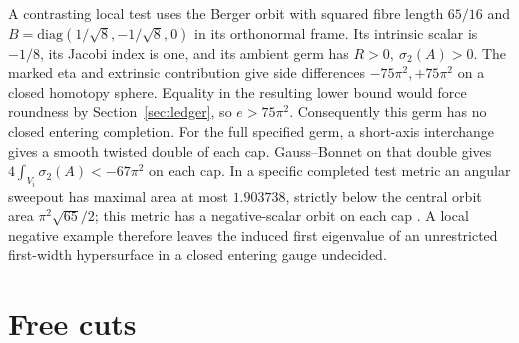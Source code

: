 \documentclass[11pt,letterpaper]{article}
\numberwithin{equation}{section}
\theoremstyle{definition}
\begin{document}
A contrasting local test uses the Berger orbit with squared fibre
length \(65/16\) and \(B=\mathrm{diag}(1/\sqrt8,-1/\sqrt8,0)\) in its
orthonormal frame. Its intrinsic scalar is \(-1/8\), its Jacobi index
is one, and its ambient germ has \(R>0,\ \sigma_2(A)>0\).
The marked eta and extrinsic contribution give side differences
\(-75\pi^2,+75\pi^2\) on a closed homotopy sphere. Equality in the
resulting lower bound would force roundness by Section~\ref{sec:ledger},
so \(e>75\pi^2\). Consequently this germ has no closed entering
completion. For the full specified germ, a short-axis interchange
gives a smooth twisted double of each cap. Gauss--Bonnet on that
double gives \(4\int_{V_i}\sigma_2(A)<-67\pi^2\) on each cap. In
a specific completed test metric an angular sweepout has
maximal area at most \(1.903738\), strictly below the central orbit area
\(\pi^2\sqrt{65}/2\); this metric has a negative-scalar orbit on each
cap \cite[GEO, Berger completion]{Baker2026MarkedCutCalculations}.
A local negative example therefore leaves the induced first eigenvalue
of an unrestricted first-width hypersurface in a closed entering gauge
undecided.

\section{Free cuts}\label{sec:free}
\end{document}
